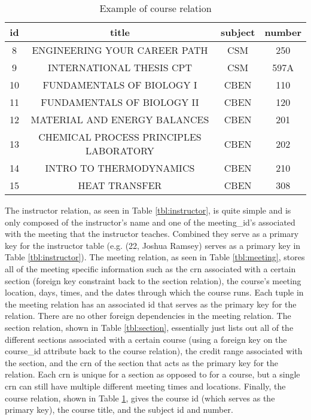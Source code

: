 \documentclass[12pt,letterpaper,titlepage]{article}
\begin{document}
\begin{table}[H]
\centering
\begin{tabular}{|c|c|c|c|}
\hline
id & title & subject & number \\ \hline
8 & ENGINEERING YOUR CAREER PATH & CSM & 250 \\ \hline
9 & INTERNATIONAL THESIS CPT & CSM & 597A \\ \hline
10 & FUNDAMENTALS OF BIOLOGY I & CBEN & 110 \\ \hline
11 & FUNDAMENTALS OF BIOLOGY II & CBEN & 120 \\ \hline
12 & MATERIAL AND ENERGY BALANCES & CBEN & 201 \\ \hline
13 & CHEMICAL PROCESS PRINCIPLES LABORATORY & CBEN & 202 \\ \hline
14 & INTRO TO THERMODYNAMICS & CBEN & 210 \\ \hline
15 & HEAT TRANSFER & CBEN & 308 \\ \hline
\end{tabular}
\caption{\label{tbl:course}Example of course relation}
\end{table}

The instructor relation, as seen in Table \ref{tbl:instructor}, is quite simple and is only composed of the instructor's name and one of the meeting\_id's associated with the meeting that the instructor teaches. Combined they serve as a primary key for the instructor table (e.g. (22, Joshua Ramsey) serves as a primary key in Table \ref{tbl:instructor}). The meeting relation, as seen in Table \ref{tbl:meeting}, stores all of the meeting specific information such as the crn associated with a certain section (foreign key constraint back to the section relation), the course's meeting location, days, times, and the dates through which the course runs. Each tuple in the meeting relation has an associated id that serves as the primary key for the relation. There are no other foreign dependencies in the meeting relation. The section relation, shown in Table \ref{tbl:section}, essentially just lists out all of the different sections associated with a certain course (using a foreign key on the course\_id attribute back to the course relation), the credit range associated with the section, and the crn of the section that acts as the primary key for the relation. Each crn is unique for a section as opposed to for a course, but a single crn can still have multiple different meeting times and locations. Finally, the course relation, shown in Table \ref{tbl:course}, gives the course id (which serves as the primary key), the course title, and the subject id and number.
\end{document}
